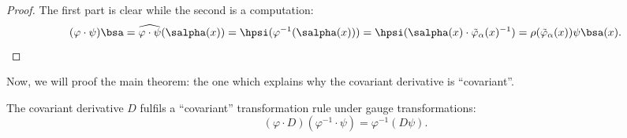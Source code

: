 \begin{proof}
	The first part is clear while the second is a computation:
	\begin{equation}
		(\varphi\cdot\psi)\bsa=\widehat{\varphi\cdot\psi}(\salpha(x))
		=\hpsi(\varphi^{-1}(\salpha(x)))
		=\hpsi(\salpha(x)\cdot\tilde{\varphi}_{\alpha}(x)^{-1})
		=\rho(\tilde{\varphi}_{\alpha}(x))\psi\bsa(x).
	\end{equation}
\end{proof}

Now, we will proof the main theorem: the one which explains why the covariant derivative is ``covariant''.

\begin{theorem}\label{th:covariance}
	The covariant derivative $D$ fulfils a ``covariant'' transformation rule under gauge transformations:
	\begin{equation}\label{eq:covariance_math}
		(\varphi\cdot D)(\varphi^{-1}\cdot \psi)=\varphi^{-1}(D\psi).
	\end{equation}
\end{theorem}

